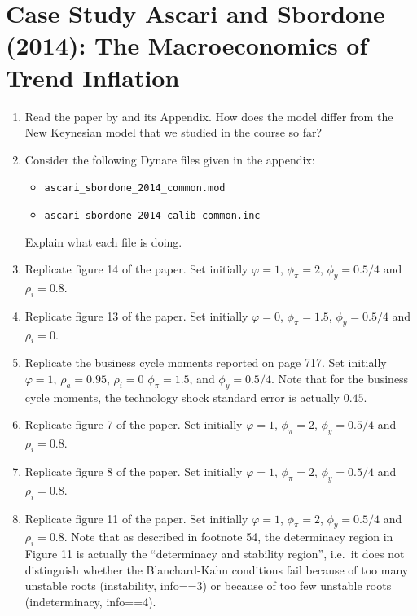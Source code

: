 \section[Case Study Ascari and Sbordone (2014): The Macroeconomics of Trend Inflation]{Case Study Ascari and Sbordone (2014): The Macroeconomics of Trend Inflation\label{ex:CaseStudy.Ascari.Sbordone.2014}}

\begin{enumerate}
\item Read the paper by \textcite{Ascari.Sbordone_2014_MacroeconomicsTrendInflation} and its Appendix.
How does the model differ from the New Keynesian model that we studied in the course so far?

\item Consider the following Dynare files given in the appendix:
\begin{itemize}
  \item \texttt{ascari\_sbordone\_2014\_common.mod}
  \item \texttt{ascari\_sbordone\_2014\_calib\_common.inc}
\end{itemize}
Explain what each file is doing.

\item Replicate figure 14 of the paper.
Set initially \(\varphi = 1\), \(\phi_\pi=2\), \(\phi_y = 0.5/4\) and \(\rho_i=0.8\).

\item Replicate figure 13 of the paper.
Set initially \(\varphi = 0\), \(\phi_\pi=1.5\), \(\phi_y = 0.5/4\) and \(\rho_i=0\).

\item Replicate the business cycle moments reported on page 717.
Set initially \(\varphi = 1\), \(\rho_a=0.95\), \(\rho_i=0\) \(\phi_\pi=1.5\), and \(\phi_y = 0.5/4\).
Note that for the business cycle moments, the technology shock standard error is actually \(0.45\).

\item Replicate figure 7 of the paper.
Set initially \(\varphi = 1\), \(\phi_\pi=2\), \(\phi_y = 0.5/4\) and \(\rho_i=0.8\).

\item Replicate figure 8 of the paper.
Set initially \(\varphi = 1\), \(\phi_\pi=2\), \(\phi_y = 0.5/4\) and \(\rho_i=0.8\).

\item Replicate figure 11 of the paper.
Set initially \(\varphi = 1\), \(\phi_\pi=2\), \(\phi_y = 0.5/4\) and \(\rho_i=0.8\).
Note that as described in footnote 54, the determinacy region in Figure 11 is actually the \enquote{determinacy and stability region},
  i.e.\ it does not distinguish whether the Blanchard-Kahn conditions fail because of too many unstable roots (instability, info==3)
  or because of too few unstable roots (indeterminacy, info==4).

\end{enumerate}


